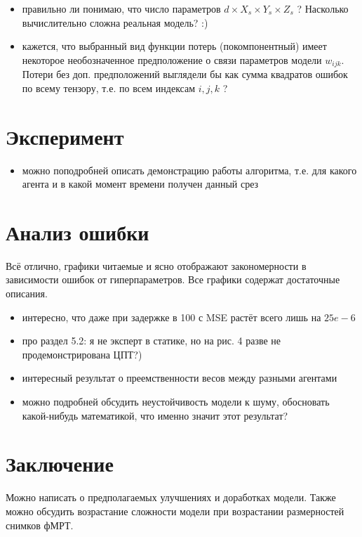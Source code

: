 	\begin{itemize}
		\item правильно ли понимаю, что число параметров $d \times X_s \times Y_s \times Z_s$ ? Насколько вычислительно сложна реальная модель? :) 
		\item кажется, что выбранный вид функции потерь (покомпонентный) имеет некоторое необозначенное предположение о связи параметров модели $w_{ijk}$. Потери без доп. предположений выглядели бы как сумма квадратов ошибок по всему тензору, т.е. по всем индексам $i, j, k$ ?
	\end{itemize}

	\section*{Эксперимент}
	
	\begin{itemize}
		\item можно поподробней описать демонстрацию работы алгоритма, т.е. для какого агента и в какой момент времени получен данный срез
	\end{itemize}

	\section*{Анализ ошибки}
	
	Всё отлично, графики читаемые и ясно отображают закономерности в зависимости ошибок от гиперпараметров. Все графики содержат достаточные описания. 
	
	\begin{itemize}
		\item интересно, что даже при задержке в 100 с MSE растёт всего лишь на $25e-6$ 
		\item про раздел 5.2: я не эксперт в статике, но на рис. 4 разве не продемонстрирована ЦПТ?)
		\item интересный результат о преемственности весов между разными агентами
		\item можно подробней обсудить неустойчивость модели к шуму, обосновать какой-нибудь математикой, что именно значит этот результат? 
	\end{itemize}

	\section*{Заключение}
	
	Можно написать о предполагаемых улучшениях и доработках модели. Также можно обсудить возрастание сложности модели при возрастании размерностей снимков фМРТ.
	
